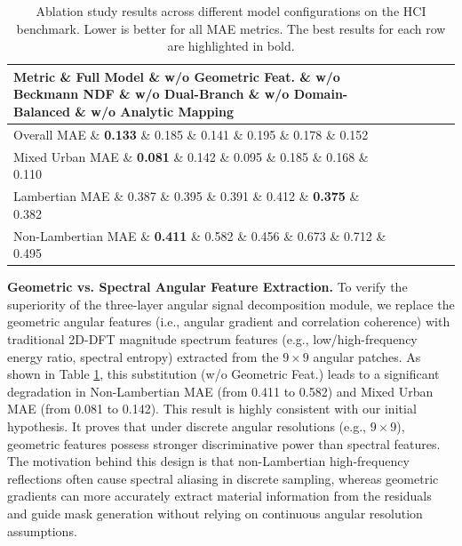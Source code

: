 \begin{table}[htbp]
\centering
\caption{Ablation study results across different model configurations on the HCI benchmark. Lower is better for all MAE metrics. The best results for each row are highlighted in bold.}
\label{tab:ablation}
\renewcommand{\arraystretch}{1.3}
\begin{tabular}{l|ccccc}
\hline
\textbf{Metric} \& \textbf{Full Model} \& \textbf{w/o Geometric Feat.} \& \textbf{w/o Beckmann NDF} \& \textbf{w/o Dual-Branch} \& \textbf{w/o Domain-Balanced} \& \textbf{w/o Analytic Mapping} \\
\hline
Overall MAE \& \textbf{0.133} \& 0.185 \& 0.141 \& 0.195 \& 0.178 \& 0.152 \\
Mixed Urban MAE \& \textbf{0.081} \& 0.142 \& 0.095 \& 0.185 \& 0.168 \& 0.110 \\
Lambertian MAE \& 0.387 \& 0.395 \& 0.391 \& 0.412 \& \textbf{0.375} \& 0.382 \\
Non-Lambertian MAE \& \textbf{0.411} \& 0.582 \& 0.456 \& 0.673 \& 0.712 \& 0.495 \\
\hline
\end{tabular}
\end{table}

\textbf{Geometric vs. Spectral Angular Feature Extraction.} 
To verify the superiority of the three-layer angular signal decomposition module, we replace the geometric angular features (i.e., angular gradient and correlation coherence) with traditional 2D-DFT magnitude spectrum features (e.g., low/high-frequency energy ratio, spectral entropy) extracted from the $9 \times 9$ angular patches. As shown in Table \ref{tab:ablation}, this substitution (w/o Geometric Feat.) leads to a significant degradation in Non-Lambertian MAE (from 0.411 to 0.582) and Mixed Urban MAE (from 0.081 to 0.142). This result is highly consistent with our initial hypothesis. It proves that under discrete angular resolutions (e.g., $9 \times 9$), geometric features possess stronger discriminative power than spectral features. The motivation behind this design is that non-Lambertian high-frequency reflections often cause spectral aliasing in discrete sampling, whereas geometric gradients can more accurately extract material information from the residuals and guide mask generation without relying on continuous angular resolution assumptions.


